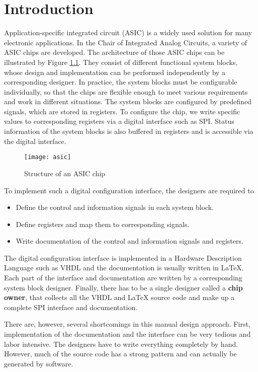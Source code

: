 \chapter{Introduction}
Application-specific integrated circuit (ASIC) is a widely used solution for many electronic applications. In the Chair of Integrated Analog Circuits, a variety of ASIC chips are developed. The architecture of those ASIC chips can be illustrated by Figure \ref{fig:Structure of an ASIC Chip}. They consist of different functional system blocks, whose design and implementation can be performed independently by a corresponding designer. In practice, the system blocks must be configurable individually, so that the chips are flexible enough to meet various requirements and work in different situations. The system blocks are configured by predefined signals, which are stored in registers. To configure the chip, we write specific values to corresponding registers via a digital interface such as SPI. Status information of the system blocks is also buffered in registers and is accessible via the digital interface.

\begin{figure}[htb]
\centering
\texttt{[image: asic]}
\caption{Structure of an ASIC chip\label{fig:Structure of an ASIC Chip}}
\end{figure}

To implement such a digital configuration interface, the designers are required to
\begin{itemize}
\item Define the control and information signals in each system block.
\item Define registers and map them to corresponding signals.
\item Write documentation of the control and information signals and registers.
\end{itemize}

The digital configuration interface is implemented in a Hardware Description Language such as VHDL and the documentation is usually written in LaTeX. Each part of the interface and documentation are written by a corresponding system block designer. Finally, there has to be a single designer called a \textbf{chip owner}, that collects all the VHDL and LaTeX source code and make up a complete SPI interface and documentation.

There are, however, several shortcomings in this manual design approach. First, implementation of the documentation and the interface can be very tedious and labor intensive. The designers have to write everything completely by hand. However, much of the source code has a strong pattern and can actually be generated by software.


